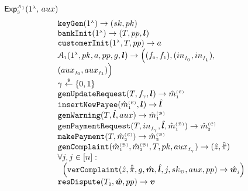 \begin{definition}[Privacy]
\begin{enumerate}[leftmargin=*]
{\small{
\begin{center}
\begin{mybox}[colback=white,  width=78mm, height=66mm, left=-1mm, drop fuzzy shadow southwest]{$\mathsf{Exp}_{\scriptscriptstyle 3}^{\scriptscriptstyle\mathcal{A}_{\scriptscriptstyle 1}}(1^{\scriptscriptstyle\lambda}\text{, }  {aux})$}
\vspace{-1.2mm}
$$
  \begin{array}{l}
%
 \mathtt{keyGen}(1^{\st\lambda})\rightarrow (sk,pk) \\
%
  \mathtt{bankInit}(1^{\st \lambda})\rightarrow (T, pp, \bm{l}) \\
%
\mathtt{customerInit} (1^{\st \lambda}, T, pp)\rightarrow a \\
%
\mathcal{A}_{\st 1}(1^{\st \lambda}, pk, a, pp, g, \bm{l})\rightarrow \Big((f_{\st 0}, f_{\st 1}),(in_{\st f_{\st_{\st 0}}},in_{\st f_{\st _1}}),\\ ({aux}_{\st f_{0}},{aux}_{\st f_{\st1}})\Big) \\
%
\gamma\stackrel{\st \$}\leftarrow\{0,1\} \\
%
\mathtt{genUpdateRequest}(T, f_{\st \gamma}, {\bm l})\rightarrow \hat m^{\st\mathcal{(C)}}_{\st 1} \\
%
\mathtt{insertNewPayee}(\hat{m}^{\st\mathcal{(C)}}_{\st 1}, {\bm l})\rightarrow  \hat{\bm l} \\
%
\mathtt{genWarning}(T, \hat{\bm l}, {aux})\rightarrow \hat m^{\st\mathcal{(B)}}_{\st1} \\
%
\mathtt{genPaymentRequest}(T, in_{\st f_{_\gamma}}, \hat{\bm{l}}, \hat m^{\st\mathcal{(B)}}_{\st1})\rightarrow \hat m^{\st\mathcal{(C)}}_{\st2} \\
%
\mathtt{makePayment}(T, \hat m^{\st\mathcal{(C)}}_{\st2})\rightarrow \hat m^{\st\mathcal{(B)}}_{\st2} \\
%
\mathtt{genComplaint}(\hat m^{\st\mathcal{(B)}}_{\st 1}, \hat m^{\st\mathcal{(B)}}_{\st2}, T, pk, {aux}_{\st f_{_\gamma}})\rightarrow (\hat z, \hat{\ddot \pi}) \\
%
 \forall j, j\in [n]:\\
\hspace{2mm}\Big(\mathtt{verComplaint}( \hat z, \hat{\ddot{\pi}}, g, \hat{\bm m}, \hat{\bm{l}}, j, sk_{\st\mathcal D}, aux, pp)\rightarrow \hat{\bm{w}}_{\st j}
\Big)
 \\
\mathtt{resDispute}(T_{\st 2}, \hat {\bm w}, pp)\rightarrow \bm v
\\
%
%
   \end{array} 
$$
\end{mybox}
\end{center}
}}
%


\end{enumerate}
\end{definition}
